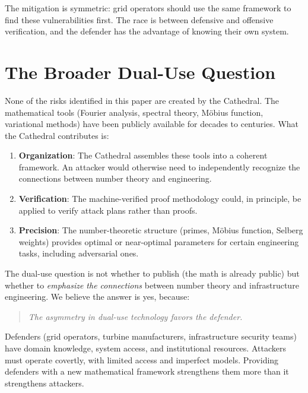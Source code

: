\documentclass[11pt,a4paper]{article}
\begin{document}
The mitigation is symmetric: grid operators should use the same
framework to find these vulnerabilities first. The race is between
defensive and offensive verification, and the defender has the
advantage of knowing their own system.

\section{The Broader Dual-Use Question}

None of the risks identified in this paper are created by the
Cathedral. The mathematical tools (Fourier analysis, spectral
theory, M\"obius function, variational methods) have been publicly
available for decades to centuries. What the Cathedral contributes
is:

\begin{enumerate}
  \item \textbf{Organization}: The Cathedral assembles these tools
    into a coherent framework. An attacker would otherwise need to
    independently recognize the connections between number theory
    and engineering.
  \item \textbf{Verification}: The machine-verified proof
    methodology could, in principle, be applied to verify attack
    plans rather than proofs.
  \item \textbf{Precision}: The number-theoretic structure (primes,
    M\"obius function, Selberg weights) provides optimal or
    near-optimal parameters for certain engineering tasks,
    including adversarial ones.
\end{enumerate}

The dual-use question is not whether to publish (the math is
already public) but whether to \emph{emphasize the connections}
between number theory and infrastructure engineering. We believe
the answer is yes, because:

\begin{quote}
\emph{The asymmetry in dual-use technology favors the defender.}
\end{quote}

Defenders (grid operators, turbine manufacturers, infrastructure
security teams) have domain knowledge, system access, and
institutional resources. Attackers must operate covertly, with
limited access and imperfect models. Providing defenders with a
new mathematical framework strengthens them more than it
strengthens attackers.
\end{document}
